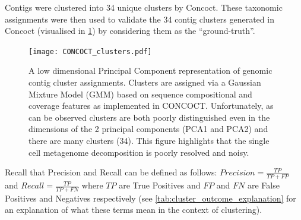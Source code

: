 Contigs were clustered into 34 unique clusters by Concoct.
These taxonomic assignments were then used to validate the 34 contig clusters 
generated in Concoct (visualised in \cref{fig:concoct_clusters}) by considering them
as the ``ground-truth''.

\begin{figure}
	\texttt{[image: CONCOCT\_clusters.pdf]}
    \caption[Genomic contig clustering]{A low dimensional Principal Component representation of genomic contig
		cluster assignments.  Clusters are assigned via a Gaussian Mixture Model (GMM) 
		based on sequence compositional and coverage features as implemented in CONCOCT.
		Unfortunately, as can be observed clusters are both poorly distinguished even
        in the dimensions of the 2 principal components (PCA1 and PCA2) and there are many clusters (34).
    This figure highlights that the single cell metagenome decomposition is poorly resolved and noisy.}
	\label{fig:concoct_clusters}
\end{figure}

\begin{table}
    \caption[Explanation of potential clustering errors]{A contextual explanation of True and False Positive and Negatives in the context of contig binning/clustering.  Top left indicates what a
		True Positive (TP) means in this context, bottom left a False Positive (FP).  Similarly Top Right explains a True Negative (TN) and Bottom Right a
		False Negative (FN)}
	\label{tab:cluster_outcome_explanation}
\end{table}

Recall that Precision and Recall can be defined as follows:
\( Precision = \frac{TP}{TP+FP}\) and \(Recall = \frac{TP}{TP+FN} \)
where \(TP\) are True Positives and \(FP\) and \(FN\) are False Positives
and Negatives respectively (see \cref{tab:cluster_outcome_explanation} for an 
explanation of what these terms mean in the context of clustering).

